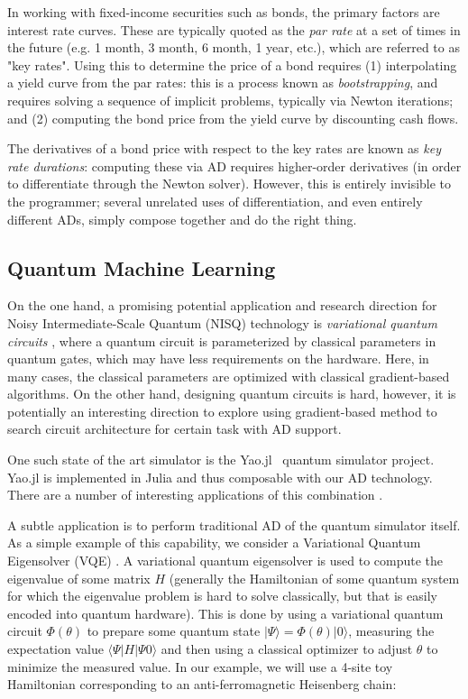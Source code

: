 \documentclass{juliacon}
\begin{document}
In working with fixed-income securities such as bonds, the primary factors are interest rate curves. These are typically quoted as the \emph{par rate} at a set of times in the future (e.g. 1 month, 3 month, 6 month, 1 year, etc.), which are referred to as "key rates". Using this to determine the price of a bond requires (1) interpolating a yield curve from the par rates: this is a process known as \emph{bootstrapping}, and requires solving a sequence of implicit problems, typically via Newton iterations; and (2) computing the bond price from the yield curve by discounting cash flows.

The derivatives of a bond price with respect to the key rates are known as \emph{key rate durations}: computing these via AD requires higher-order derivatives (in order to differentiate through the Newton solver). However, this is entirely invisible to the programmer; several unrelated uses of differentiation, and even entirely different ADs, simply compose together and do the right thing.


\subsection{Quantum Machine Learning}
\label{yao}

On the one hand, a promising potential application and research direction for Noisy Intermediate-Scale Quantum (NISQ) technology \cite{preskill2018quantum} is \textit{variational quantum circuits} \cite{benedetti2019parameterized}, where a quantum circuit is parameterized by classical parameters in quantum gates, which may have less requirements on the hardware. Here, in many cases, the classical parameters are optimized with classical gradient-based algorithms. On the other hand, designing quantum circuits is hard, however, it is potentially an interesting direction to explore using gradient-based method to search  circuit architecture for certain task with AD support.

One such state of the art simulator is the Yao.jl~\cite{yao.jl} quantum simulator project. Yao.jl is implemented in Julia and thus composable with our AD technology. There are a number of interesting applications of this combination \cite{mitarai2018quantum, liu2018differentiable, liu2019variational}.

A subtle application is to perform traditional AD of the quantum simulator itself. As a simple example of this capability, we consider a Variational Quantum Eigensolver (VQE) \cite{kandala2017hardware}. A variational quantum eigensolver is used to compute the eigenvalue of some matrix $H$ (generally the Hamiltonian of some quantum system for which the eigenvalue problem is hard to solve classically, but that is easily encoded into quantum hardware). This is done by using a variational quantum circuit $\Phi(\theta)$ to prepare some quantum state $|\Psi\rangle = \Phi(\theta)|0\rangle$, measuring the expectation value $\langle \Psi|H|\Psi 0 \rangle$ and then using a classical optimizer to adjust $\theta$ to minimize the measured value. In our example, we will use a 4-site toy Hamiltonian corresponding to an anti-ferromagnetic Heisenberg chain:
\end{document}
